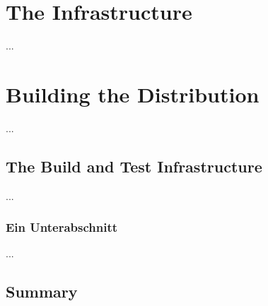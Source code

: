 
\chapter{The  Infrastructure}
\label{cha:Infrastructure}

...

\cite{PAMS2013-NorNet}


\chapter{Building the  Distribution}
\label{cha:Distribution}

...

\section{The Build and Test Infrastructure}
\label{sec:The-Build-and-Test-Infrastructure}

...

\subsection{Ein Unterabschnitt}

...

\section{Summary}

